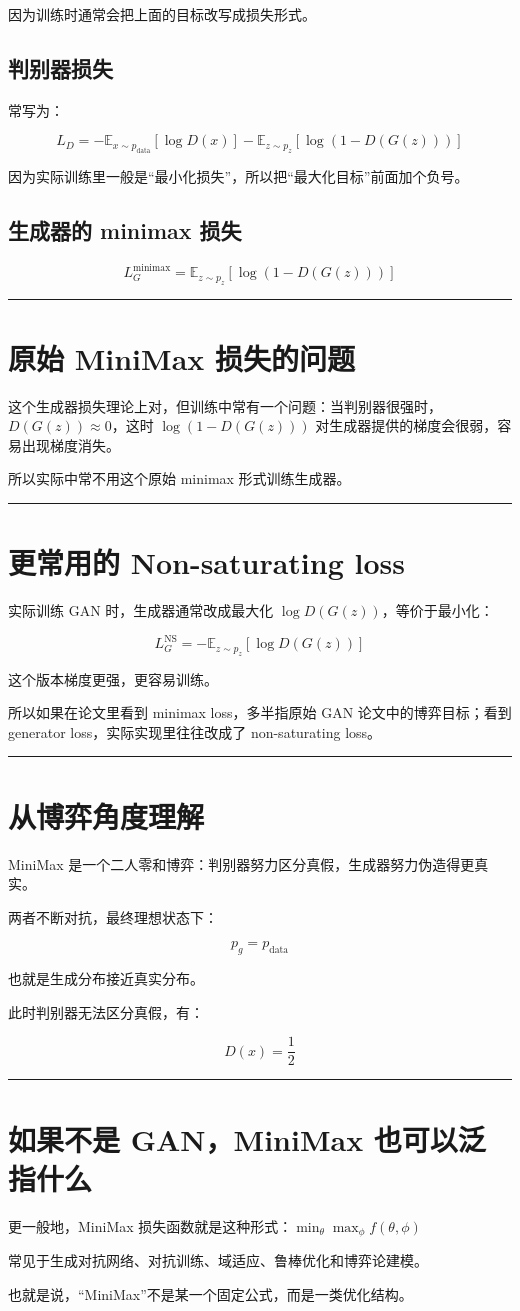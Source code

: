 因为训练时通常会把上面的目标改写成损失形式。

\subsection{判别器损失}

常写为：

\[
L_D = -\mathbb E_{x\sim p_{\text{data}}}[\log D(x)] -\mathbb E_{z\sim p_z}[\log(1-D(G(z)))]
\]

因为实际训练里一般是“最小化损失”，所以把“最大化目标”前面加个负号。

\subsection{生成器的 minimax 损失}

\[
L_G^{\text{minimax}} = \mathbb E_{z\sim p_z}[\log(1-D(G(z)))]
\]

\hrule

\section{原始 MiniMax 损失的问题}

这个生成器损失理论上对，但训练中常有一个问题：当判别器很强时，\(D(G(z))\approx 0\)，这时 \(\log(1-D(G(z)))\) 对生成器提供的梯度会很弱，容易出现梯度消失。

所以实际中常不用这个原始 minimax 形式训练生成器。

\hrule

\section{更常用的 Non-saturating loss}

实际训练 GAN 时，生成器通常改成最大化 \(\log D(G(z))\)，等价于最小化：

\[
L_G^{\text{NS}} = -\mathbb E_{z\sim p_z}[\log D(G(z))]
\]

这个版本梯度更强，更容易训练。

所以如果在论文里看到 minimax loss，多半指原始 GAN 论文中的博弈目标；看到 generator loss，实际实现里往往改成了 non-saturating loss。

\hrule

\section{从博弈角度理解}

MiniMax 是一个二人零和博弈：判别器努力区分真假，生成器努力伪造得更真实。

两者不断对抗，最终理想状态下：

\[
p_g = p_{\text{data}}
\]

也就是生成分布接近真实分布。

此时判别器无法区分真假，有：

\[
D(x)=\frac12
\]

\hrule

\section{如果不是 GAN，MiniMax 也可以泛指什么}

更一般地，MiniMax 损失函数就是这种形式：\(\min_\theta \max_\phi f(\theta,\phi)\)

常见于生成对抗网络、对抗训练、域适应、鲁棒优化和博弈论建模。

也就是说，“MiniMax”不是某一个固定公式，而是一类优化结构。
